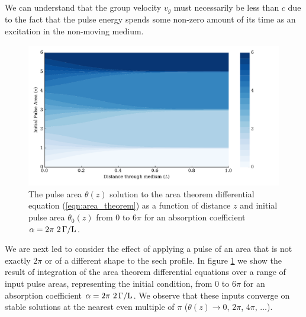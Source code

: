     We can understand that the group velocity $v_g$ must necessarily be less
    than $c$ due to the fact that the pulse energy spends some non-zero amount
    of its time as an excitation in the non-moving medium.

    \begin{figure}[]
      \includegraphics[width=\linewidth]
        {figs/03_nonlinear/plot_area_theorem_cmap_fig1.pdf}
      \caption{
        The pulse area $\theta(z)$ solution to the area theorem differential
        equation (\ref{eqn:area_theorem}) as a function of distance $z$ and
        initial pulse area $\theta_0(z)$ from $0$ to $6\pi$ for an absorption
        coefficient $\alpha =  \unit[2\pi~2]{\Gamma/L}$.
      }
      \label{fig:area_theorem_cmap}
    \end{figure}

    We are next led to consider the effect of applying a pulse of an area that
    is not exactly $2\pi$ or of a different shape to the sech profile. In figure
    \ref{fig:area_theorem_cmap} we show the result of integration of the area
    theorem differential equations over a range of input pulse areas,
    representing the initial condition, from $0$ to $6\pi$ for an absorption
    coefficient $\alpha =  \unit[2\pi~2]{\Gamma/L}$. We observe that these
    inputs converge on stable solutions at the nearest even multiple of $\pi$
    (\ie $\theta(z) \rightarrow 0$, $2\pi$, $4\pi$, $\dots$).

